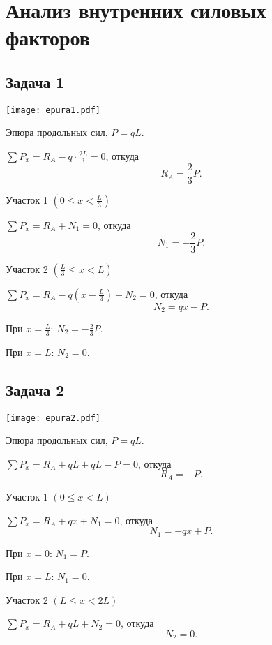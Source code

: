 \chapter{Анализ внутренних силовых факторов}

\section{Задача 1}

\begin{floatingfigure}[r]{0.5\textwidth}
    \centering
    \texttt{[image: epura1.pdf]}
    \caption{Эпюра продольных сил, $P = qL$.}
    \label{fig:chap1-epura1}
\end{floatingfigure}

$\sum P_x = R_A - q \cdot \frac{2L}{3} = 0$,
откуда
\[
    R_A = \frac{2}{3} P.
\]

Участок 1 $ \left(0 \le x < \frac{L}{3}\right)$

$\sum P_{x} = R_A + N_1 = 0$,
откуда
\[
    N_1 = -\frac{2}{3} P.
\]

Участок 2 $ \left(\frac{L}{3} \le x < L\right)$

$\sum P_{x} = R_A - q \left(x - \frac{L}{3}\right) + N_2= 0$,
откуда
\[
    N_2 = qx - P.
\]

При $x = \frac{L}{3}$: $N_2 = -\frac{2}{3} P$.

При $x = L$: $N_2 = 0$.

\newpage


\section{Задача 2}

\begin{floatingfigure}[r]{0.5\textwidth}
    \centering
    \texttt{[image: epura2.pdf]}
    \caption{Эпюра продольных сил, $P = qL$.}
    \label{fig:chap1-epura2}
\end{floatingfigure}

$\sum P_x = R_A + qL + qL - P = 0$,
откуда
\[
    R_A = -P.
\]

Участок 1 $\left(0 \le x < L\right)$

$\sum P_{x} = R_A + qx + N_1= 0$,
откуда
\[
    N_1 = -qx + P.
\]

При $x = 0$: $N_1 = P$.

При $x = L$: $N_1 = 0$.

Участок 2 $\left(L \le x < 2L\right)$

$\sum P_{x} = R_A + qL + N_2= 0$,
откуда
\[
    N_2 = 0.
\]

